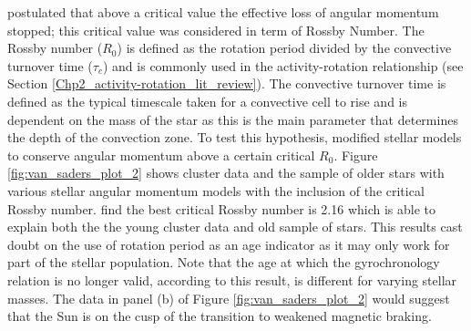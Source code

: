 \citet{van_Saders_etal_2016} postulated that above a critical value the effective loss of angular momentum stopped; this critical value was considered in term of Rossby Number. The Rossby number ($R_{0}$) is defined as the rotation period divided by the convective turnover time ($\tau_{c}$) and is commonly used in the activity-rotation relationship (see Section \ref{Chp2_activity-rotation_lit_review}). The convective turnover time is defined as the typical timescale taken for a convective cell to rise and is dependent on the mass of the star as this is the main parameter that determines the depth of the convection zone. To test this hypothesis, \citet{van_Saders_etal_2016} modified stellar models to conserve angular momentum above a certain critical $R_{0}$. Figure \ref{fig:van_saders_plot_2} shows cluster data and the sample of older stars with various stellar angular momentum models with the inclusion of the critical Rossby number. \citet{van_Saders_etal_2016} find the best critical Rossby number is 2.16 which is able to explain both the the young cluster data and old sample of stars. This results cast doubt on the use of rotation period as an age indicator as it may only work for part of the stellar population. Note that the age at which the gyrochronology relation is no longer valid, according to this result, is different for varying stellar masses. The data in panel (b) of Figure \ref{fig:van_saders_plot_2} would suggest that the Sun is on the cusp of the transition to weakened magnetic braking.

